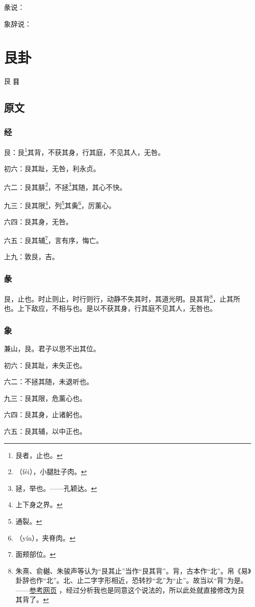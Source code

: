 \documentclass[12pt,oneside]{book}
\begin{document}
彖说：

象辞说：



\chapter{艮卦}
艮 {\Large ䷳}


\section{原文}

\subsection{经}
艮：艮\footnote{艮者，止也。}其背，不获其身，行其庭，不见其人，无咎。

初六：艮其趾，无咎，利永贞。

六二：艮其腓\footnote{（féi），小腿肚子肉。}，不拯\footnote{拯，举也。——孔颖达。}其随，其心不快。

九三：艮其限\footnote{上下身之界。}，列\footnote{通裂。}其夤\footnote{（yín），夹脊肉。}，厉薰心。

六四：艮其身，无咎。

六五：艮其辅\footnote{面颊部位。}，言有序，悔亡。

上九：敦艮，吉。


\subsection{彖}
艮，止也。时止则止，时行则行，动静不失其时，其道光明。艮其背\footnote{朱熹、俞樾、朱骏声等认为“艮其止”当作“艮其背”。背，古本作“北”。帛《易》卦辞也作“北”。北、止二字字形相近，恐转抄“北”为“止”。故当以“背”为是。——\href{https://www.vsucai.cn/yizhuan/content-52.html}{参考网页} ，经过分析我也是同意这个说法的，所以此处就直接修改为艮其背了。}，止其所也。上下敌应，不相与也。是以不获其身，行其庭不见其人，无咎也。

\subsection{象}
兼山，艮。君子以思不出其位。

初六：艮其趾，未失正也。

六二：不拯其随，未退听也。

九三：艮其限，危薰心也。

六四：艮其身，止诸躬也。

六五：艮其辅，以中正也。
\end{document}
